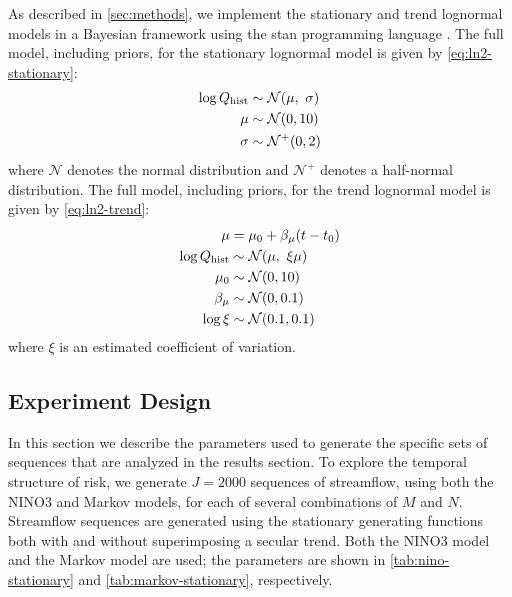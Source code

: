 \documentclass[
]{agujournal2018}
\newcommand{\normal}{\mathcal{N}}
\begin{document}
As described in \cref{sec:methods}, we implement the stationary and trend lognormal models in a Bayesian framework using the stan programming language \citep{Carpenter:2017ke}.
The full model, including priors, for the stationary lognormal model is given by \cref{eq:ln2-stationary}:
\begin{align}\label{eq:ln2-stationary}
  \begin{split}
    \log Q_\text{hist} & \sim \normal \qty(\mu, \ \sigma) \\
    \mu &\sim \normal \qty(0, 10) \\
    \sigma &\sim \normal^+ \qty(0, 2)
  \end{split}
\end{align}
where $\normal$ denotes the normal distribution and $\normal^+$ denotes a half-normal distribution.
The full model, including priors, for the trend lognormal model is given by \cref{eq:ln2-trend}:
\begin{align}\label{eq:ln2-trend}
  \begin{split}
    \mu &= \mu_0 + \beta_\mu \qty(t - t_0) \\
  \log Q_\text{hist} & \sim \normal \qty(\mu, \ \xi \mu) \\
  \mu_0 & \sim \normal \qty(0, 10) \\
  \beta_\mu & \sim \normal \qty(0, 0.1) \\
  \log \xi & \sim \normal \qty(0.1, 0.1)
  \end{split}
\end{align}
where $\xi$ is an estimated coefficient of variation.

\subsection{Experiment Design}\label{sec:methods-experiments}

In this section we describe the parameters used to generate the specific sets of sequences that are analyzed in the results section.
To explore the temporal structure of risk, we generate $J=2000$ sequences of streamflow, using both the NINO3 and Markov models, for each of several combinations of $M$ and $N$.
Streamflow sequences are generated using the stationary generating functions both with and without superimposing a secular trend.
Both the NINO3 model and the Markov model are used; the parameters are shown in \cref{tab:nino-stationary} and \cref{tab:markov-stationary}, respectively.
\end{document}
